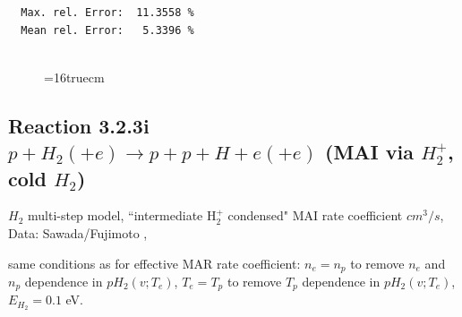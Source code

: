 \documentclass[12pt,dvipdfmx]{article}
\begin{document}
\begin{small}
\begin{verbatim}
  Max. rel. Error:  11.3558 %
  Mean rel. Error:   5.3396 %


\end{verbatim}\end{small}
\begin{figure} \label{3.2.3mad}
\epsfxsize=16truecm
\end{figure}
\newpage

\subsection{
Reaction 3.2.3i   $p + H_2 (+e)  \rightarrow p + p + H +e (+e) $ (MAI via $H_2^+$, cold $H_2$)
}

$H_2$ multi-step model, ``intermediate H$_2^+$ condensed" MAI rate coefficient $cm^3/s$,
 Data: Sawada/Fujimoto ,\cite{kn:Sawada}

same conditions as for effective MAR rate coefficient: $n_e=n_p$ to remove $n_e$ and $n_p$ dependence in $pH_2(v;T_e)$,
$T_e=T_p$ to remove $T_p$ dependence in $pH_2(v;T_e)$,  $E_{H_2}=0.1$ eV.
\end{document}

